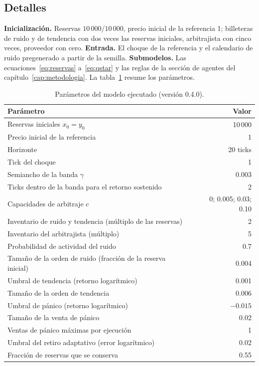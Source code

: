 \subsection*{Detalles}

\textbf{Inicialización.} Reservas $10\,000/10\,000$, precio inicial de la referencia 1; billeteras de ruido y de tendencia con dos veces las reservas iniciales, arbitrajista con cinco veces, proveedor con cero. \textbf{Entrada.} El choque de la referencia y el calendario de ruido pregenerado a partir de la semilla. \textbf{Submodelos.} Las ecuaciones~\eqref{eq:reservas} a~\eqref{eq:qstar} y las reglas de la sección de agentes del capítulo~\ref{cap:metodologia}. La tabla~\ref{tab:parametros} resume los parámetros.

\begin{table}[htbp]
\centering
\caption{Parámetros del modelo ejecutado (versión 0.4.0).}
\label{tab:parametros}
\small
\begin{tabular}{@{}lr@{}}
\toprule
Parámetro & Valor \\
\midrule
Reservas iniciales $x_0=y_0$ & 10\,000 \\
Precio inicial de la referencia & 1 \\
Horizonte & 20 ticks \\
Tick del choque & 1 \\
Semiancho de la banda $\gamma$ & 0.003 \\
Ticks dentro de la banda para el retorno sostenido & 2 \\
Capacidades de arbitraje $c$ & 0; 0.005; 0.03; 0.10 \\
Inventario de ruido y tendencia (múltiplo de las reservas) & 2 \\
Inventario del arbitrajista (múltiplo) & 5 \\
Probabilidad de actividad del ruido & 0.7 \\
Tamaño de la orden de ruido (fracción de la reserva inicial) & 0.004 \\
Umbral de tendencia (retorno logarítmico) & 0.001 \\
Tamaño de la orden de tendencia & 0.006 \\
Umbral de pánico (retorno logarítmico) & $-0.015$ \\
Tamaño de la venta de pánico & 0.02 \\
Ventas de pánico máximas por ejecución & 1 \\
Umbral del retiro adaptativo (error logarítmico) & 0.02 \\
Fracción de reservas que se conserva & 0.55 \\
\bottomrule
\end{tabular}
\end{table}

